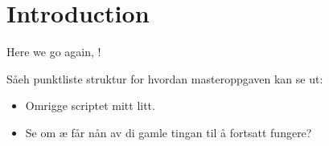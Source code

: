 \chapter{Introduction}

Here we go again, \cite{jaeger2002adaptive}!

Såeh punktliste struktur for hvordan masteroppgaven kan se ut:

\begin{itemize}
    \item Omrigge scriptet mitt litt.
    \item Se om æ får nån av di gamle tingan til å fortsatt fungere?

\end{itemize}

\cleardoublepage
